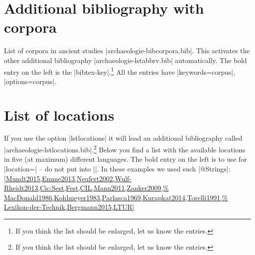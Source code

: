 \documentclass[a4paper,
10pt,
greek,
french,
spanish,
italian,
ngerman,
english
]{ltxdoc}
\begin{document}
\begin{multicols}{2}
  
\end{multicols}


\section{Additional bibliography with corpora}\label{list-bibcorpora}
List of corpora in ancient studies |archaeologie-bibcorpora.bib|.
This activates the other additional bibliography |archaeologie-lstabbrv.bib| automatically.
The bold entry on the left is the |bibtex-key|.\footnote{If you think the list should be enlarged, let us know the entries.}
All the entries have |keywords={corpus}|, |options={corpus}|.
\begin{multicols}{2}
  
\end{multicols}

\section{List of locations}\label{list-locations}
If you use the option |lstlocations| it will load an additional bibliography called |archaeologie-lstlocations.bib|.\footnote{If you think the list should be enlarged, let us know the entries.} 
Below you find a list with the available locations in five (at maximum) different languages.
The bold entry on the left is to use for |location=| -- do not put  into |{}|.
In these examples we used such |@Strings|:
\cref{Mundt2015,Emme2013,Neufert2002,Wulf-Rheidt2013,Cic:Sest,Fest,CIL,Mann2011,Zanker2009,%
MacDonald1986,Kohlmeyer1983,Parlasca1969,Kurapkat2014,Torelli1991,%
Lexikon-der-Technik,Bergmann2015,LTUR}
\end{document}
